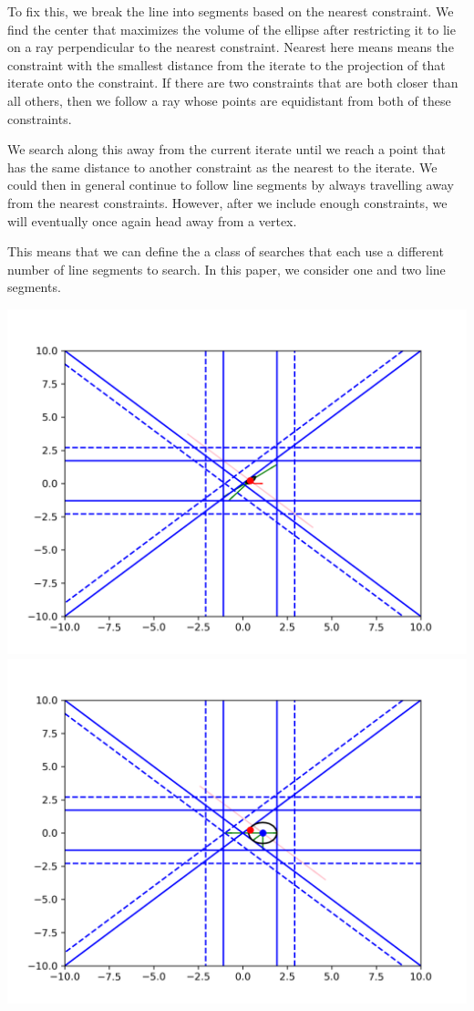 \documentclass{article}
\begin{document}
To fix this, we break the line into segments based on the nearest constraint.
We find the center that maximizes the volume of the ellipse after restricting it to lie on a ray perpendicular to the nearest constraint.
Nearest here means means the constraint with the smallest distance from the iterate to the projection of that iterate onto the constraint.
If there are two constraints that are both closer than all others, then we follow a ray whose points are equidistant from both of these constraints.

We search along this away from the current iterate until we reach a point that has the same distance to another constraint as the nearest to the iterate.
We could then in general continue to follow line segments by always travelling away from the nearest constraints.
However, after we include enough constraints, we will eventually once again head away from a vertex.

This means that we can define the a class of searches that each use a different number of line segments to search.
In this paper, we consider one and two line segments.

\includegraphics[scale=0.2]{run_away_1.png}
\includegraphics[scale=0.2]{run_away_2.png}
\end{document}
